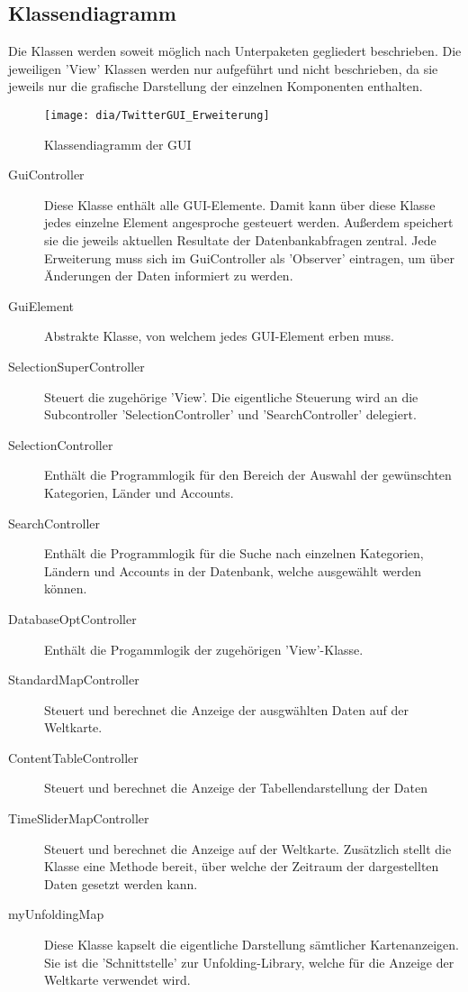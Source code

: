 \subsection{Klassendiagramm}
Die Klassen werden soweit möglich nach Unterpaketen gegliedert beschrieben. Die jeweiligen 'View' Klassen werden nur aufgeführt und nicht beschrieben, da sie jeweils nur die grafische Darstellung der einzelnen Komponenten enthalten.

\begin{figure}[h!]
	\centering
	\texttt{[image: dia/TwitterGUI\_Erweiterung]}
	\caption{Klassendiagramm der GUI}
	\label{fig:GUI}
\end{figure}
\begin{description}
	\item[GuiController] Diese Klasse enthält alle GUI-Elemente. Damit kann über diese Klasse jedes einzelne Element angesproche gesteuert werden. Außerdem speichert sie die jeweils aktuellen Resultate der Datenbankabfragen zentral. Jede Erweiterung muss sich im GuiController als 'Observer' eintragen, um über Änderungen der Daten informiert zu werden. 
	\item[GuiElement] Abstrakte Klasse, von welchem jedes GUI-Element erben muss.
	\item[SelectionSuperController] Steuert die zugehörige 'View'. Die eigentliche Steuerung wird an die Subcontroller 'SelectionController' und 'SearchController' delegiert.
    \item[SelectionController] Enthält die Programmlogik für den Bereich der Auswahl der gewünschten Kategorien, Länder und Accounts.
	\item[SearchController] Enthält die Programmlogik für die Suche nach einzelnen Kategorien, Ländern und Accounts in der Datenbank, welche ausgewählt werden können. 
    \item[DatabaseOptController] Enthält die Progammlogik der zugehörigen 'View'-Klasse.
    \item [StandardMapController] Steuert und berechnet die Anzeige der ausgwählten Daten auf der Weltkarte.
    \item [ContentTableController] Steuert und berechnet die Anzeige der Tabellendarstellung der Daten
	\item [TimeSliderMapController] Steuert und berechnet die Anzeige auf der Weltkarte. Zusätzlich stellt die Klasse eine Methode bereit, über welche der Zeitraum der dargestellten Daten gesetzt werden kann.
	\item [myUnfoldingMap] Diese Klasse kapselt die eigentliche Darstellung sämtlicher Kartenanzeigen. Sie ist die 'Schnittstelle' zur Unfolding-Library, welche für die Anzeige der Weltkarte verwendet wird.
\end{description}
